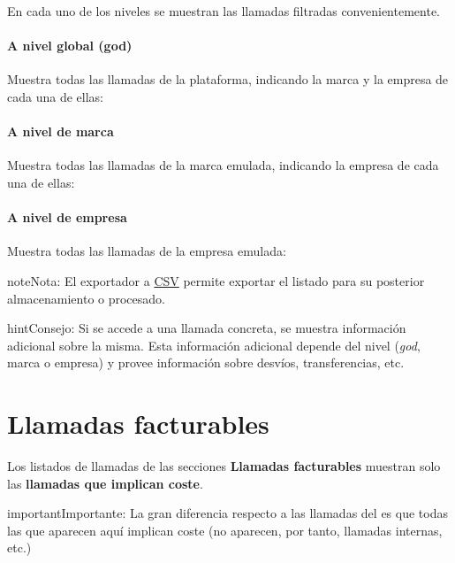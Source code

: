 \documentclass[letterpaper,10pt,spanish]{sphinxmanual}
\begin{document}
En cada uno de los niveles se muestran las llamadas filtradas convenientemente.
\paragraph{A nivel global (god)}

Muestra todas las llamadas de la plataforma, indicando la marca y la empresa de cada una de ellas:

\noindent{}
\paragraph{A nivel de marca}

Muestra todas las llamadas de la marca emulada, indicando la empresa de cada una de ellas:

\noindent{}
\paragraph{A nivel de empresa}

Muestra todas las llamadas de la empresa emulada:

\noindent{}

\begin{notice}{note}{Nota:}
El exportador a \href{https://es.wikipedia.org/wiki/CSV}{CSV} permite exportar el listado para su posterior almacenamiento o procesado.
\end{notice}

\begin{notice}{hint}{Consejo:}
Si se accede a una llamada concreta, se muestra información adicional sobre la misma. Esta información adicional depende del nivel (\emph{god}, marca o empresa) y provee información sobre desvíos, transferencias, etc.
\end{notice}


\section{Llamadas facturables}
\label{billing_and_invoices/billable_calls:llamadas-facturables}\label{billing_and_invoices/billable_calls::doc}\label{billing_and_invoices/billable_calls:billable-calls}
Los listados de llamadas de las secciones \textbf{Llamadas facturables} muestran solo las \textbf{llamadas que implican coste}.

\begin{notice}{important}{Importante:}
La gran diferencia respecto a las llamadas del {\hyperref[billing_and_invoices/call_registry:call\string-registry]{}} es que todas las que aparecen aquí implican coste (no aparecen, por tanto, llamadas internas, etc.)
\end{notice}
\end{document}
